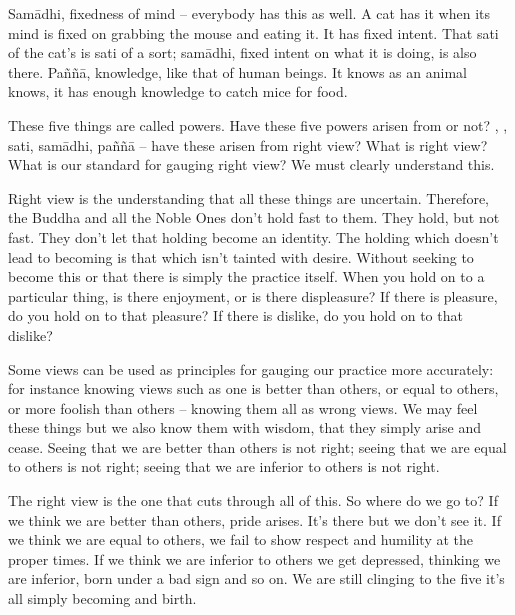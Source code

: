 Sam\=adhi, fixedness of mind -- everybody has this as well. A cat has it when its mind is fixed on grabbing the mouse and eating it. It has fixed intent. That sati of the cat's is sati of a sort; sam\=adhi, fixed intent on what it is doing, is also there. Pa\~n\~n\=a, knowledge, like that of human beings. It knows as an animal knows, it has enough knowledge to catch mice for food. 

These five things are called powers. Have these five powers arisen from  or not? , , sati, sam\=adhi, pa\~n\~n\=a -- have these arisen from right view? What is right view? What is our standard for gauging right view? We must clearly understand this. 

Right view is the understanding that all these things are uncertain. Therefore, the Buddha and all the Noble Ones don't hold fast to them. They hold, but not fast. They don't let that holding become an identity. The holding which doesn't lead to becoming is that which isn't tainted with desire. Without seeking to become this or that there is simply the practice itself. When you hold on to a particular thing, is there enjoyment, or is there displeasure? If there is pleasure, do you hold on to that pleasure? If there is dislike, do you hold on to that dislike? 

Some views can be used as principles for gauging our practice more accurately: for instance knowing views such as one is better than others, or equal to others, or more foolish than others -- knowing them all as wrong views. We may feel these things but we also know them with wisdom, that they simply arise and cease. Seeing that we are better than others is not right; seeing that we are equal to others is not right; seeing that we are inferior to others is not right. 

The right view is the one that cuts through all of this. So where do we go to? If we think we are better than others, pride arises.
It's there but we don't see it. If we think we are equal to others, we fail to show respect and humility at the proper times. If we think we are inferior to others we get depressed, thinking we are inferior, born under a bad sign and so on. We are still clinging to the five  it's all simply becoming and birth. 

